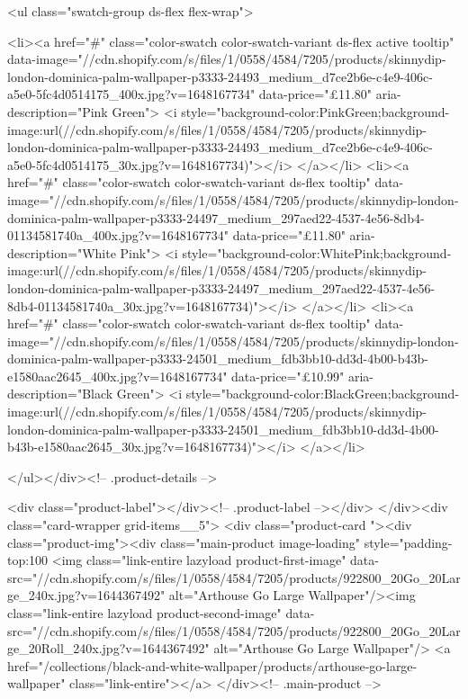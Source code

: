 {{{{{{{<ul class="swatch-group ds-flex flex-wrap">
        
<li><a href="#" class="color-swatch color-swatch-variant ds-flex active tooltip" data-image="//cdn.shopify.com/s/files/1/0558/4584/7205/products/skinnydip-london-dominica-palm-wallpaper-p3333-24493_medium_d7ce2b6e-c4e9-406c-a5e0-5fc4d0514175_400x.jpg?v=1648167734" data-price="£11.80" aria-description="Pink Green">
              <i style="background-color:PinkGreen;background-image:url(//cdn.shopify.com/s/files/1/0558/4584/7205/products/skinnydip-london-dominica-palm-wallpaper-p3333-24493_medium_d7ce2b6e-c4e9-406c-a5e0-5fc4d0514175_30x.jpg?v=1648167734)"></i>
            </a></li>
<li><a href="#" class="color-swatch color-swatch-variant ds-flex tooltip" data-image="//cdn.shopify.com/s/files/1/0558/4584/7205/products/skinnydip-london-dominica-palm-wallpaper-p3333-24497_medium_297aed22-4537-4e56-8db4-01134581740a_400x.jpg?v=1648167734" data-price="£11.80" aria-description="White Pink">
              <i style="background-color:WhitePink;background-image:url(//cdn.shopify.com/s/files/1/0558/4584/7205/products/skinnydip-london-dominica-palm-wallpaper-p3333-24497_medium_297aed22-4537-4e56-8db4-01134581740a_30x.jpg?v=1648167734)"></i>
            </a></li>
<li><a href="#" class="color-swatch color-swatch-variant ds-flex tooltip" data-image="//cdn.shopify.com/s/files/1/0558/4584/7205/products/skinnydip-london-dominica-palm-wallpaper-p3333-24501_medium_fdb3bb10-dd3d-4b00-b43b-e1580aac2645_400x.jpg?v=1648167734" data-price="£10.99" aria-description="Black Green">
              <i style="background-color:BlackGreen;background-image:url(//cdn.shopify.com/s/files/1/0558/4584/7205/products/skinnydip-london-dominica-palm-wallpaper-p3333-24501_medium_fdb3bb10-dd3d-4b00-b43b-e1580aac2645_30x.jpg?v=1648167734)"></i>
            </a></li>

      </ul></div><!-- .product-details -->

<div class="product-label"></div><!-- .product-label --></div>
          </div><div class="card-wrapper grid-items__5">
            <div class="product-card "><div class="product-img"><div class="main-product image-loading" style="padding-top:100%
      <img class="link-entire lazyload product-first-image" data-src="//cdn.shopify.com/s/files/1/0558/4584/7205/products/922800_20Go_20Large_240x.jpg?v=1644367492" alt="Arthouse Go Large Wallpaper"/><img class="link-entire lazyload product-second-image" data-src="//cdn.shopify.com/s/files/1/0558/4584/7205/products/922800_20Go_20Large_20Roll_240x.jpg?v=1644367492" alt="Arthouse Go Large Wallpaper"/>
      <a href="/collections/black-and-white-wallpaper/products/arthouse-go-large-wallpaper" class="link-entire"></a>
    </div><!-- .main-product -->
  
}}}}}}}
